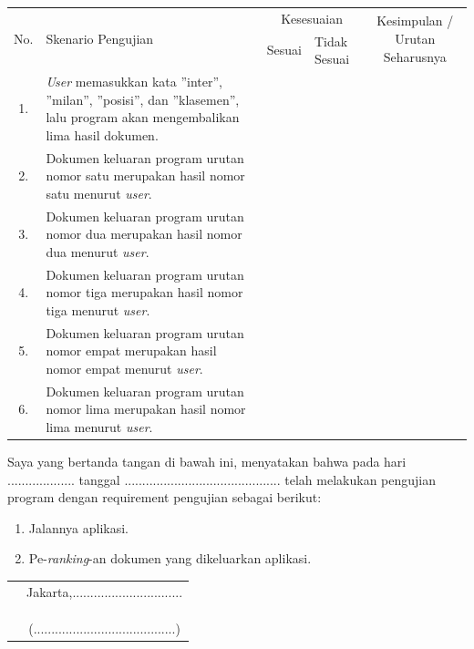 \documentclass[12pt]{report}
\begin{document}
\begin{center}
\begin{tabular}{ |c|    m{6cm}         |c|m{1cm}| c |  }
\hline
\multirow{2}{*}{No.} & \multirow{2}{6cm}{Skenario Pengujian} & \multicolumn{2}{c|}{Kesesuaian} &\multirow{2}{2.3cm}{Kesimpulan / Urutan Seharusnya} \\\cline{3-4}
	&			& Sesuai	&	Tidak Sesuai   	&		\\
 \hline
1.&\textit{User} memasukkan kata ''inter'', ''milan'', ''posisi'', dan ''klasemen'', lalu program akan mengembalikan lima hasil dokumen.&	&	& \\
\hline
 2.&Dokumen keluaran program urutan nomor satu merupakan hasil nomor satu menurut \textit{user}.&	&	& \\
 \hline
 3.&Dokumen keluaran program urutan nomor dua merupakan hasil nomor dua menurut \textit{user}.&	&	& \\
 \hline
 4.&Dokumen keluaran program urutan nomor tiga merupakan hasil nomor tiga menurut \textit{user}.&	&	& \\
 \hline
5.&Dokumen keluaran program urutan nomor empat merupakan hasil nomor empat menurut \textit{user}.&	&	& \\
 \hline
6.&Dokumen keluaran program urutan nomor lima merupakan hasil nomor lima menurut \textit{user}.&	&	& \\
 \hline
\end{tabular}
\end{center}
 
\hfill \break
\newpage
\noindent Saya yang bertanda tangan di bawah ini, menyatakan bahwa pada hari ................... tanggal ............................................ telah melakukan pengujian program dengan requirement pengujian sebagai berikut:
\begin{enumerate}
\item Jalannya aplikasi.
\item Pe-\textit{ranking}-an dokumen yang dikeluarkan aplikasi.
\end{enumerate}
\begin{center}
\begin{tabular}{ m{9cm} c}
& Jakarta,............................... \\
& \\
& \\
& \\
& (........................................) \\   
\end{tabular}
\end{center}
\end{document}
